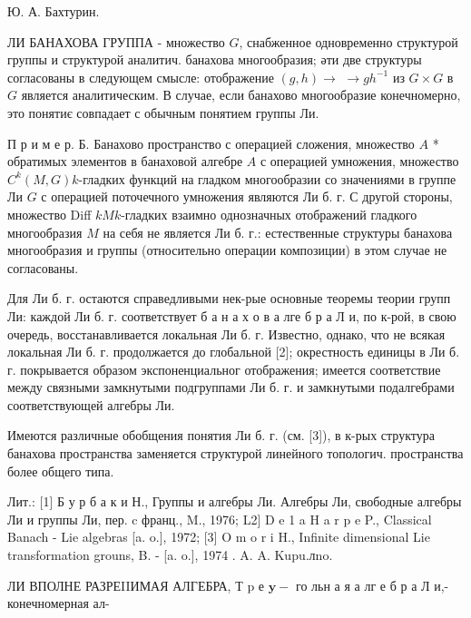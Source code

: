 \documentclass[10pt]{article}
\begin{document}
Ю. А. Бахтурин.



ЛИ БАНАХОВА ГРУППА - множество $G$, снабженное одновременно структурой группы и структурой аналитич. банахова многообразия; әти две структуры согласованы в следующем смысле: отображение $(g, h) \rightarrow$ $\rightarrow g h^{-1}$ из $G \times G$ в $G$ является аналитическим. В случае, если банахово многообразие конечномерно, это понятиє совпадает с обычным понятием группы Ли.



П р и м е р. Б. Банахово пространство с операцией сложения, множество $A$ * обратимых элементов в банаховой алгебре $A$ с операцией умножения, множество $C^{k}(M, G) k$-гладких функций на гладком многообразии со значениями в группе Ли $G$ с операцией поточечного умножения являются Ли б. г. С другой стороны, множество Diff $k M k$-гладких взаимно однозначных отображений гладкого многообразия $M$ на себя не является Ли б. г.: естественные структуры банахова многообразия и группы (относительно операции композиции) в этом случае не согласованы.



Для Ли б. г. остаются справедливыми нек-рые основные теоремы теории групп Ли: каждой Ли б. г. соответствует б а н а х о в а лге б р а Л и, по к-рой, в свою очередь, восстанавливается локальная Ли б. г. Известно, однако, что не всякая локальная Ли б. г. продолжается до глобальной [2]; окрестность единицы в Ли б. г. покрывается образом экспоненциальног отображения; имеется соответствие между связными замкнутыми подгруппами Ли б. г. и замкнутыми подалгебрами соответствующей алгебры Ли.



Имеются различные обобщения понятия Ли б. г. (см. [3]), в к-рых структура банахова пространства заменяется структурой линейного топологич. пространства более общего типа.



Лит.: [1] Б у р б а к и Н., Группы и алгебры Ли. Алгебры Ли, свободные алгебры Ли и группы Ли, пер. c франц., M., 1976; L2] D e 1 a $\mathrm{H}$ a r p e P., Classical Banach - Lie algebras [a. o.], 1972; [3] O m o r i H., Infinite dimensional Lie transformation grouns, B. - [a. o.], 1974 . A. A. Kupu.лno.



ЛИ ВПОЛНЕ РАЗРЕIIИМАЯ АЛГЕБРА, Т $\mathrm{p}$ е $\mathbf{y}-$ го льн а я а лг е б р а Л и,- конечномерная ал-
\end{document}
